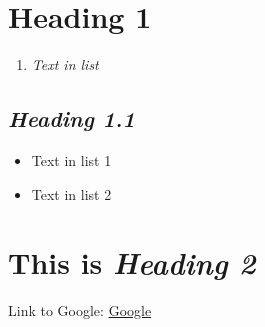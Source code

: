 \documentclass[12pt]{article}
\begin{document}
\section{\textbf{Heading 1}}
\begin{enumerate}
\item \textit{Text in list}
\end{enumerate}

\subsection{\textit{Heading 1.1}}
\begin{itemize}
\item Text in list 1
\item Text in list 2
\end{itemize}

\section{This is \textit{Heading 2}}
Link to Google: \href{https://www.google.com/}{Google}
\end{document}
